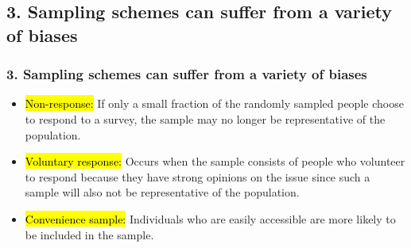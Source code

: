 \documentclass[slidestop,compress,mathserif,12pt,t,professionalfonts,xcolor=table]{beamer}
\begin{document}

\subsection{3. Sampling schemes can suffer from a variety of biases}


\begin{frame}
\frametitle{3. Sampling schemes can suffer from a variety of biases}


\begin{itemize}[<+->]

\item \hl{Non-response:} If only a small fraction of the randomly sampled people choose to respond to a survey, the sample may no longer be representative of the population.

\item \hl{Voluntary response:} Occurs when the sample consists of people who volunteer to respond because they have strong opinions on the issue since such a sample will also not be representative of the population.

\item \hl{Convenience sample:} Individuals who are easily accessible are more likely to be included in the sample.

\end{itemize}

\end{frame}

\end{document}
